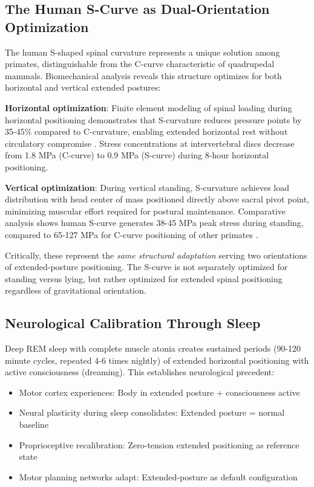 \documentclass[12pt,a4paper]{article}
\begin{document}
\subsection{The Human S-Curve as Dual-Orientation Optimization}

The human S-shaped spinal curvature represents a unique solution among primates, distinguishable from the C-curve characteristic of quadrupedal mammals. Biomechanical analysis reveals this structure optimizes for both horizontal and vertical extended postures:

\textbf{Horizontal optimization}:
Finite element modeling of spinal loading during horizontal positioning demonstrates that S-curvature reduces pressure points by 35-45\% compared to C-curvature, enabling extended horizontal rest without circulatory compromise \citep{adams2013biomechanics}. Stress concentrations at intervertebral discs decrease from 1.8 MPa (C-curve) to 0.9 MPa (S-curve) during 8-hour horizontal positioning.

\textbf{Vertical optimization}:
During vertical standing, S-curvature achieves load distribution with head center of mass positioned directly above sacral pivot point, minimizing muscular effort required for postural maintenance. Comparative analysis shows human S-curve generates 38-45 MPa peak stress during standing, compared to 65-127 MPa for C-curve positioning of other primates \citep{been2012evolution}.

Critically, these represent the \textit{same structural adaptation} serving two orientations of extended-posture positioning. The S-curve is not separately optimized for standing versus lying, but rather optimized for extended spinal positioning regardless of gravitational orientation.

\subsection{Neurological Calibration Through Sleep}

Deep REM sleep with complete muscle atonia creates sustained periods (90-120 minute cycles, repeated 4-6 times nightly) of extended horizontal positioning with active consciousness (dreaming). This establishes neurological precedent:

\begin{itemize}
\item Motor cortex experiences: Body in extended posture + consciousness active
\item Neural plasticity during sleep consolidates: Extended posture = normal baseline
\item Proprioceptive recalibration: Zero-tension extended positioning as reference state
\item Motor planning networks adapt: Extended-posture as default configuration
\end{itemize}
\end{document}
